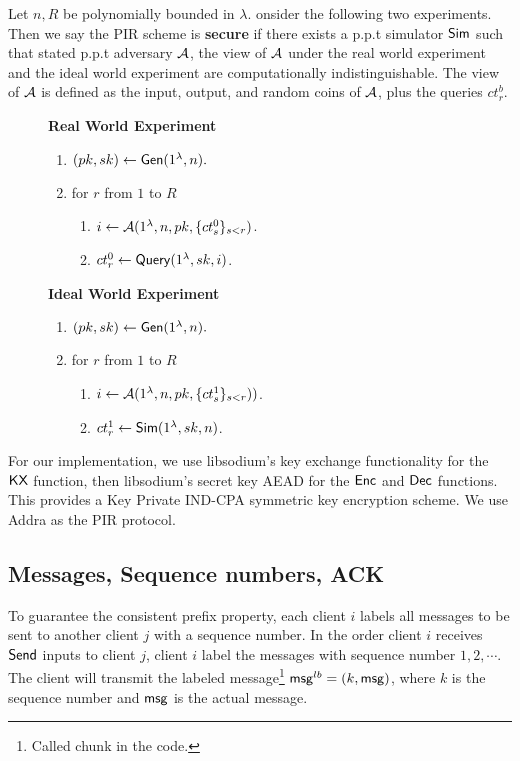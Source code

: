 \begin{definition}
\label{defn:pir-security}
Let $n, R$ be polynomially bounded in $\lambda$.  onsider the following two experiments. Then we say the PIR scheme is \textbf{secure} if there exists a p.p.t simulator $\mathsf{Sim}$ such that stated p.p.t adversary $\mathcal{A}$, the view of $\mathcal{A}$ under the real world experiment and the ideal world experiment are computationally indistinguishable. The view of $\mathcal{A}$ is defined as the input, output, and random coins of $\mathcal{A}$, plus the queries $ct_r^b$.
\begin{figure}[h!]
\begin{framed}
\textbf{Real World Experiment}
\begin{enumerate}
    \item $(pk, sk) \leftarrow \mathsf{Gen}(1^{\lambda}, n).$
    \item for $r$ from $1$ to $R$
    \begin{enumerate}
        \item $i \leftarrow \mathcal{A}(1^{\lambda}, n, pk, \{ct_s^0\}_{s < r})$.
        \item $ct_r^0 \leftarrow \mathsf{Query}(1^{\lambda}, sk, i)$.
    \end{enumerate}
\end{enumerate}
\textbf{Ideal World Experiment}
\begin{enumerate}
    \item $(pk, sk) \leftarrow \mathsf{Gen}(1^{\lambda}, n).$
    \item for $r$ from $1$ to $R$
    \begin{enumerate}
        \item $i \leftarrow \mathcal{A}(1^{\lambda}, n, pk, \{ct_s^1\}_{s < r}))$.
        \item $ct_r^1 \leftarrow \mathsf{Sim}(1^{\lambda}, sk, n)$.
    \end{enumerate}
\end{enumerate}
\end{framed}
\end{figure}
\end{definition}
For our implementation, we use libsodium's key exchange functionality for the $\mathsf{KX}$ function, then libsodium's secret key AEAD for the $\mathsf{Enc}$ and $\mathsf{Dec}$ functions. This provides a Key Private IND-CPA symmetric key encryption scheme. We use Addra as the PIR protocol.
\subsection{Messages, Sequence numbers, ACK}
To guarantee the consistent prefix property, each client $i$ labels all messages to be sent to another client $j$ with a sequence number. In the order client $i$ receives $\mathsf{Send}$ inputs to client $j$, client $i$ label the messages with sequence number $1,2,\cdots$. The client will transmit the labeled message\footnote{Called chunk in the code.} $\mathsf{msg}^{lb} = (k, \mathsf{msg})$, where $k$ is the sequence number and $\mathsf{msg}$ is the actual message. 

